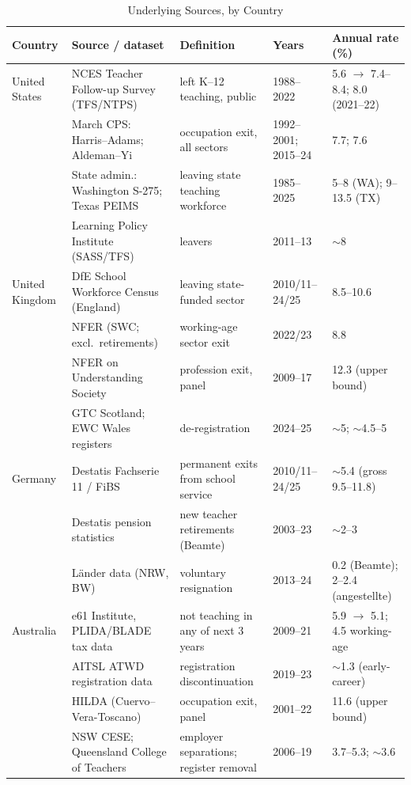 \documentclass[11pt,a4paper]{article}
\begin{document}
\begin{table}[H]
\centering\footnotesize
\setlength{\tabcolsep}{4pt}
\caption{Underlying Sources, by Country}
\label{tab:detail}
\begin{tabular}{p{2.2cm}p{4.4cm}p{4.2cm}p{1.9cm}p{2.5cm}}
\toprule
Country & Source / dataset & Definition & Years & Annual rate (\%) \\
\midrule
United States & NCES Teacher Follow-up Survey (TFS/NTPS) & left K--12 teaching, public & 1988--2022 & 5.6 $\rightarrow$ 7.4--8.4; 8.0 (2021--22) \\
 & March CPS: Harris--Adams; Aldeman--Yi & occupation exit, all sectors & 1992--2001; 2015--24 & 7.7; 7.6 \\
 & State admin.: Washington S-275; Texas PEIMS & leaving state teaching workforce & 1985--2025 & 5--8 (WA); 9--13.5 (TX) \\
 & Learning Policy Institute (SASS/TFS) & leavers & 2011--13 & $\sim$8 \\
\addlinespace
United Kingdom & DfE School Workforce Census (England) & leaving state-funded sector & 2010/11--24/25 & 8.5--10.6 \\
 & NFER (SWC; excl.\ retirements) & working-age sector exit & 2022/23 & 8.8 \\
 & NFER on Understanding Society & profession exit, panel & 2009--17 & 12.3 (upper bound) \\
 & GTC Scotland; EWC Wales registers & de-registration & 2024--25 & $\sim$5; $\sim$4.5--5 \\
\addlinespace
Germany & Destatis Fachserie 11 / FiBS & permanent exits from school service & 2010/11--24/25 & $\sim$5.4 (gross 9.5--11.8) \\
 & Destatis pension statistics & new teacher retirements (Beamte) & 2003--23 & $\sim$2--3 \\
 & L\"ander data (NRW, BW) & voluntary resignation & 2013--24 & 0.2 (Beamte); 2--2.4 (angestellte) \\
\addlinespace
Australia & e61 Institute, PLIDA/BLADE tax data & not teaching in any of next 3 years & 2009--21 & 5.9 $\rightarrow$ 5.1; 4.5 working-age \\
 & AITSL ATWD registration data & registration discontinuation & 2019--23 & $\sim$1.3 (early-career) \\
 & HILDA (Cuervo--Vera-Toscano) & occupation exit, panel & 2001--22 & 11.6 (upper bound) \\
 & NSW CESE; Queensland College of Teachers & employer separations; register removal & 2006--19 & 3.7--5.3; $\sim$3.6 \\

\end{tabular}
\end{table}
\end{document}
